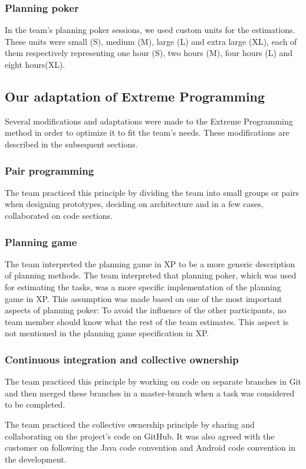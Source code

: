 \subsubsection{Planning poker}
In the team's planning poker sessions, we used custom units for the estimations. These units were small (S), medium (M), large (L) and extra large (XL), each of them respectively representing one hour (S), two hours (M), four hours (L) and eight hours(XL).

\subsection{Our adaptation of Extreme Programming}
\label{sec:adapExtremeProgr}
Several modifications and adaptations were made to the Extreme Programming method in order to optimize it to fit the team's needs. These modifications are described in the subsequent sections.

\subsubsection{Pair programming}
The team practiced this principle by dividing the team into small groups or pairs when designing prototypes, deciding on architecture and in a few cases, collaborated on code sections.

\subsubsection{Planning game}
The team interpreted the planning game in XP to be a more generic description of planning methods. The team interpreted that planning poker, which was used for estimating the tasks, was a more specific implementation of the planning game in XP. This assumption was made based on one of the most important aspects of planning poker: To avoid the influence of the other participants, no team member should know what the rest of the team estimates. This aspect is not mentioned in the planning game specification in XP.

\subsubsection{Continuous integration and collective ownership}
The team practiced this principle by working on code on separate branches in Git and then merged these branches in a master-branch when a task was considered to be completed.

The team practiced the collective ownership principle by sharing and collaborating on the project's code on GitHub. It was also agreed with the customer on following the Java code convention and Android code convention in the development.

